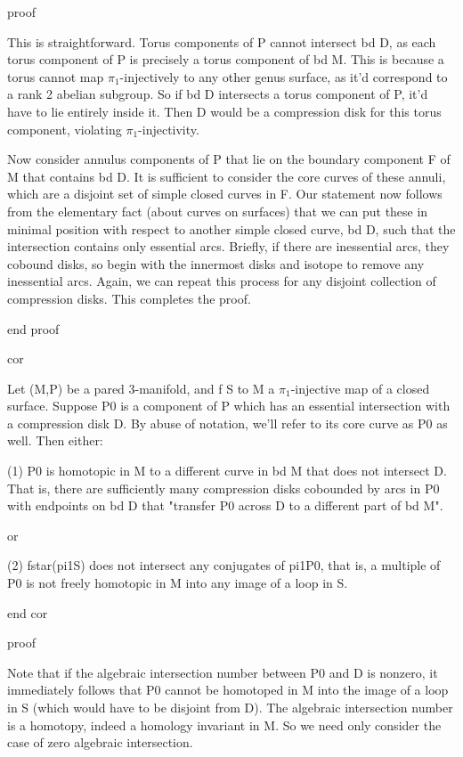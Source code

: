 proof

This is straightforward. Torus components of P cannot intersect bd D, as each
torus component of P is precisely a torus component of bd M. This is because
a torus cannot map $\pi_1$-injectively to any other genus surface, as it'd
correspond to a rank 2 abelian subgroup. So if bd D intersects a torus
component of P, it'd have to lie entirely inside it. Then D would be
a compression disk for this torus component, violating $\pi_1$-injectivity.

Now consider annulus components of P that lie on the boundary component F of
M that contains bd D. It is sufficient to consider the core curves of these
annuli, which are a disjoint set of simple closed curves in F. Our statement
now follows from the elementary fact (about curves on surfaces) that we can put
these in minimal position with respect to another simple closed curve, bd D,
such that the intersection contains only essential arcs. Briefly, if there are
inessential arcs, they cobound disks, so begin with the innermost disks and
isotope to remove any inessential arcs. Again, we can repeat this process for
any disjoint collection of compression disks. This completes the proof.

end proof

cor

Let (M,P) be a pared 3-manifold, and f \colon S to M a $\pi_1$-injective map of
a closed surface. Suppose P0 is a component of P which has an essential
intersection with a compression disk D. By abuse of notation, we'll refer to
its core curve as P0 as well. Then either:

(1) P0 is homotopic in M to a different curve in bd M that does not intersect
D. That is, there are sufficiently many compression disks cobounded by arcs in
P0 with endpoints on bd D that "transfer P0 across D to a different part of bd
M".

or

(2) fstar(pi1S) does not intersect any conjugates of pi1P0, that is, a multiple
of P0 is not freely homotopic in M into any image of a loop in S.

end cor

proof

Note that if the algebraic intersection number between P0 and D is nonzero, it
immediately follows that P0 cannot be homotoped in M into the image of a loop
in S (which would have to be disjoint from D). The algebraic intersection
number is a homotopy, indeed a homology invariant in M. So we need only
consider the case of zero algebraic intersection.

